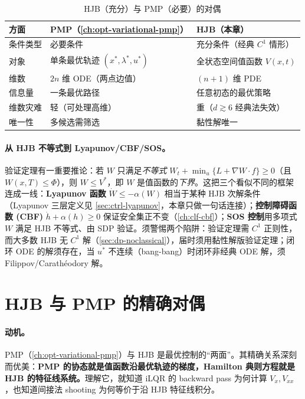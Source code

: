 \begin{table}[H]\centering\small
\caption{HJB（充分）与 PMP（必要）的对偶}
\label{tab:dp-hjb-vs-pmp}
\begin{tabular}{lll}
\toprule
方面 & PMP（\cref{ch:opt-variational-pmp}） & HJB（本章） \\
\midrule
条件类型 & 必要条件 & 充分条件（经典 $C^1$ 情形） \\
对象 & 单条最优轨迹 $(x^*,\lambda^*,u^*)$ & 全状态空间值函数 $V(x,t)$ \\
维数 & $2n$ 维 ODE（两点边值） & $(n+1)$ 维 PDE \\
信息量 & 一条最优路径 & 任意初态的最优策略 \\
维数灾难 & 轻（可处理高维） & 重（$d\gtrsim6$ 经典法失效） \\
唯一性 & 多候选需筛选 & 黏性解唯一 \\
\bottomrule
\end{tabular}
\end{table}

\paragraph{从 HJB 不等式到 Lyapunov/CBF/SOS。}验证定理有一重要推论：若 $W$ 只满足\emph{不等式} $W_t+\min_u\{L+\nabla W\cdot f\}\ge0$（且 $W(x,T)\le\Phi$），则 $W\le V^*$，即 $W$ 是值函数的\emph{下界}。这把三个看似不同的框架连成一线：\textbf{Lyapunov 函数} $\dot W\le-\alpha(W)$ 相当于某种 HJB 次解条件（Lyapunov 三层定义见 \cref{sec:ctrl-lyapunov}，本章只做一句话连接）；\textbf{控制障碍函数 (CBF)} $\dot h+\alpha(h)\ge0$ 保证安全集正不变（\cref{ch:clf-cbf}）；\textbf{SOS 控制}用多项式 $W$ 满足 HJB 不等式、由 SDP 验证。须警惕两个陷阱：验证定理需 $C^1$ 正则性，而大多数 HJB 无 $C^1$ 解（\cref{sec:dp-noclassical}），届时须用黏性解版验证定理；闭环 ODE 的解须存在，当 $u^*$ 不连续（bang-bang）时闭环非经典 ODE 解，须 Filippov/Carathéodory 解。

\section{HJB 与 PMP 的精确对偶}
\label{sec:dp-hjb-pmp}

\paragraph{动机。}
PMP（\cref{ch:opt-variational-pmp}）与 HJB 是最优控制的“两面”。其精确关系深刻而优美：\textbf{PMP 的协态就是值函数沿最优轨迹的梯度，Hamilton 典则方程就是 HJB 的特征线系统。}理解它，就知道 iLQR 的 backward pass 为何计算 $V_x,V_{xx}$，也知道间接法 shooting 为何等价于沿 HJB 特征线积分。

